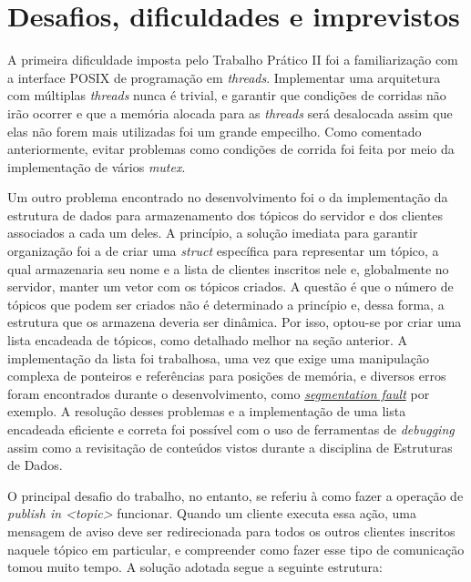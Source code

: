 \documentclass{article}
\begin{document}
\section{Desafios, dificuldades e imprevistos}

A primeira dificuldade imposta pelo Trabalho Prático II foi a familiarização
com a
interface POSIX de programação em \textit{threads}. Implementar uma arquitetura
com múltiplas \textit{threads}
nunca é trivial, e garantir que condições de corridas não irão ocorrer e que a
memória alocada para as \textit{threads} será desalocada assim que elas não
forem mais utilizadas foi um grande empecilho. Como comentado anteriormente,
evitar problemas como condições de corrida foi feita por meio da implementação
de vários \textit{mutex}.

Um outro problema encontrado no desenvolvimento foi o da implementação da
estrutura de dados para armazenamento dos tópicos do servidor e dos clientes
associados a cada um deles. A princípio, a solução imediata para garantir
organização foi a de criar uma \textit{struct} específica para representar um
tópico, a qual armazenaria seu nome e a lista de clientes inscritos nele e,
globalmente no servidor, manter um vetor com os tópicos criados. A questão é
que o número de tópicos que podem ser criados não é determinado a princípio e,
dessa forma, a estrutura que os armazena deveria ser dinâmica. Por isso,
optou-se por criar uma lista encadeada de tópicos, como detalhado melhor na
seção anterior. A implementação
da lista foi trabalhosa, uma vez que exige uma manipulação complexa de
ponteiros e referências para posições de memória, e diversos erros foram
encontrados durante o desenvolvimento, como
\href{https://en.wikipedia.org/wiki/Segmentation_fault}{\textit{segmentation
            fault}} por exemplo. A resolução desses problemas e a implementação
de uma lista encadeada eficiente e correta foi possível com o uso de
ferramentas de \textit{debugging} assim como a revisitação de conteúdos vistos
durante a disciplina de Estruturas de Dados.

O principal desafio do trabalho, no entanto, se referiu à como fazer a operação
de \textit{publish in <topic>} funcionar. Quando um cliente executa essa ação,
uma mensagem de aviso deve ser redirecionada para todos os outros
clientes inscritos naquele tópico em particular, e compreender como fazer esse
tipo de comunicação tomou muito tempo. A solução adotada segue a seguinte
estrutura:
\end{document}
